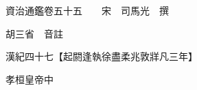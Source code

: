 










 


 
 


 

  
  
  
  
  





  
  
  
  
  
 
  

  

  
  
  



  

 
 

  
   




  

  
  


  　　資治通鑑卷五十五　　宋　司馬光　撰

　　胡三省　音註

　　漢紀四十七【起閼逢執徐盡柔兆敦牂凡三年】

　　孝桓皇帝中


